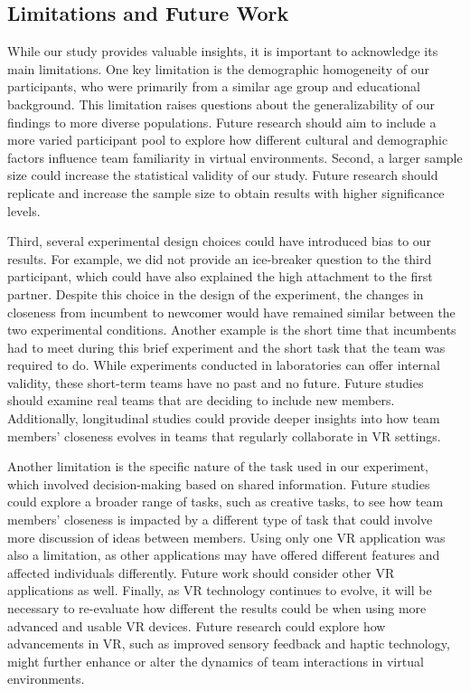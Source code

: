 \subsection{Limitations and Future Work}
While our study provides valuable insights, it is important to acknowledge its main limitations. One key limitation is the demographic homogeneity of our participants, who were primarily from a similar age group and educational background. This limitation raises questions about the generalizability of our findings to more diverse populations. Future research should aim to include a more varied participant pool to explore how different cultural and demographic factors influence team familiarity in virtual environments. Second, a larger sample size could increase the statistical validity of our study. Future research should replicate and increase the sample size to obtain results with higher significance levels. 

Third, several experimental design choices could have introduced bias to our results. For example, we did not provide an ice-breaker question to the third participant, which could have also explained the high attachment to the first partner. Despite this choice in the design of the experiment, the changes in closeness from incumbent to newcomer would have remained similar between the two experimental conditions. Another example is the short time that incumbents had to meet during this brief experiment and the short task that the team was required to do. While experiments conducted in laboratories can offer internal validity, these short-term teams have no past and no future. Future studies should examine real teams that are deciding to include new members. Additionally, longitudinal studies could provide deeper insights into how team members' closeness evolves in teams that regularly collaborate in VR settings.

Another limitation is the specific nature of the task used in our experiment, which involved decision-making based on shared information. Future studies could explore a broader range of tasks, such as creative tasks, to see how team members' closeness is impacted by a different type of task that could involve more discussion of ideas between members. Using only one VR application was also a limitation, as other applications may have offered different features and affected individuals differently. Future work should consider other VR applications as well. Finally, as VR technology continues to evolve, it will be necessary to re-evaluate how different the results could be when using more advanced and usable VR devices. Future research could explore how advancements in VR, such as improved sensory feedback and haptic technology, might further enhance or alter the dynamics of team interactions in virtual environments. 




